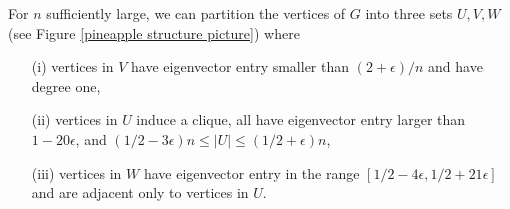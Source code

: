 
\begin{proposition}\label{almost pineapple structure}
For $n$ sufficiently large, we can partition the vertices of $G$ into three 
sets $U, V, W$ (see Figure \ref{pineapple structure picture}) where 
\begin{itemize}
 \item[(i)] vertices in $V$ have eigenvector entry smaller than $(2+\epsilon) / n$ and have degree one, 
 \item[(ii)] vertices in $U$ induce a clique, 
 all have eigenvector entry larger than $1 - 20\epsilon$, and $(1/2 - 3\epsilon) n \leq |U| \leq (1/2 + \epsilon)n$,

 \item[(iii)] vertices in $W$ have eigenvector entry in the range $\left[1/2 - 4\epsilon,  1/2 + 21 \epsilon \right]$ and are adjacent only to vertices in $U$.  
\end{itemize}
\end{proposition}

